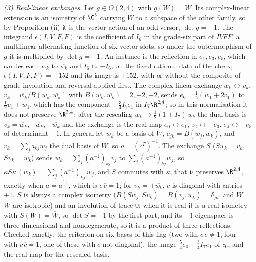 \emph{(3) Real-linear exchanges.} Let $g \in O(2,4)$ with $g(W) = \overline W$. Its complex-linear extension is an isometry of $\C^6$ carrying $W$ to a subspace of the other family, so by Proposition (ii) it is the vector action of an odd versor, $\det g = -1$. The integrand $\epsilon(I,V,F,F)$ is the coefficient of $I_6$ in the grade-six part of $IVFF$, a multilinear alternating function of six vector slots, so under the outermorphism of $g$ it is multiplied by $\det g = -1$. An instance is the reflection in $e_1, e_3, e_5$, which carries each $w_k$ to $\overline{w_k}$ and $I_6$ to $-I_6$; on the fixed rational data of the check, $\epsilon(I,V,F,F) = -152$ and its image is $+152$, with or without the composite of grade involution and reversal applied first. The complex-linear exchange $w_k \leftrightarrow v_k$, $v_k = \overline{w_k}/B(w_k,\overline{w_k})$ with $B(w_k,\overline{w_k}) = 2, -2, -2$, sends $e_0 = \tfrac12(w_1 + 2v_1)$ to $\tfrac12 v_1 + w_1$, which has the component $-\tfrac34 I_7e_1$ in $I_7\R^{2,4}$; so in this normalisation it does not preserve $\R^{2,4}$; after the rescaling $w_k \to \tfrac12(1 + I_7)\,w_k$ the dual basis is $v_k = \overline{w_k}, -\overline{w_k}, -\overline{w_k}$ and the exchange is the real map $e_0 \leftrightarrow e_1$, $e_2 \leftrightarrow -e_3$, $e_4 \leftrightarrow -e_5$ of determinant $-1$. In general let $w_k$ be a basis of $W$, $c_{jk} = B(w_j, \overline{w_k})$, and $v_k = \sum_j a_{kj}\overline{w_j}$ the dual basis of $\overline W$, so $a = (c^{T})^{-1}$. The exchange $S$ ($Sw_k = v_k$, $Sv_k = w_k$) sends $\overline{w_k} = \sum_j (a^{-1})_{kj}v_j$ to $\sum_j (a^{-1})_{kj}w_j$, so $\kappa S\kappa\,(w_k) = \sum_j \overline{(a^{-1})_{kj}}\,\overline{w_j}$, and $S$ commutes with $\kappa$, that is preserves $\R^{2,4}$, exactly when $a = \overline{a^{-1}}$, which is $c\,\overline{c} = 1$; for $v_k = \pm\overline{w_k}$, $c$ is diagonal with entries $\pm1$. $S$ is always a complex isometry ($B(Sw_j, Sv_k) = B(v_j, w_k) = \delta_{jk}$, and $W$, $\overline W$ are isotropic) and an involution of trace $0$; when it is real it is a real isometry with $S(W) = \overline W$, so $\det S = -1$ by the first part, and its $-1$ eigenspace is three-dimensional and nondegenerate, so it is a product of three reflections. Checked exactly: the criterion on six bases of this flag (two with $c\,\overline c \neq 1$, four with $c\,\overline c = 1$, one of these with $c$ not diagonal), the image $\tfrac54 e_0 - \tfrac34 I_7e_1$ of $e_0$, and the real map for the rescaled basis.

